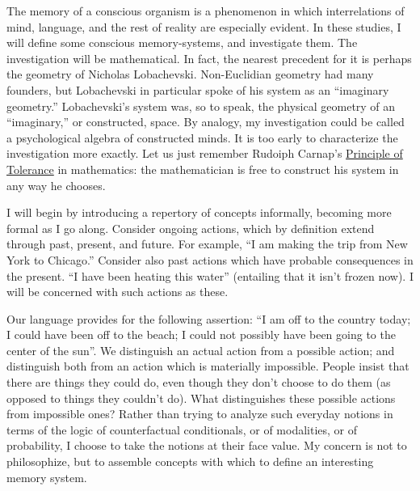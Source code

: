 

The memory of a conscious organism is a phenomenon in which 
interrelations of mind, language, and the rest of reality are especially evident. 
In these studies, I will define some conscious memory-systems, and 
investigate them. The investigation will be mathematical. In fact, the nearest 
precedent for it is perhaps the geometry of Nicholas Lobachevski. 
Non-Euclidian geometry had many founders, but Lobachevski in particular 
spoke of his system as an \enquote{imaginary geometry.} Lobachevski's system was, 
so to speak, the physical geometry of an \enquote{imaginary,} or constructed, space. 
By analogy, my investigation could be called a psychological algebra of 
constructed minds. It is too early to characterize the investigation more 
exactly. Let us just remember Rudoiph Carnap's \uline{Principle of Tolerance} in 
mathematics: the mathematician is free to construct his system in any way 
he chooses. 

I will begin by introducing a repertory of concepts informally, becoming more formal as I go along. Consider ongoing actions, which by definition extend through past, present, and future. For example, \enquote{I am making the trip from New York to Chicago.} Consider also past actions which have probable consequences in the present. \enquote{I have been heating this water} (entailing that it isn't frozen now). I will be concerned with such actions as these. 

Our language provides for the following assertion: \enquote{I am off to the country today; I could have been off to the beach; I could not possibly have been going to the center of the sun}. We distinguish an actual action from a possible action; and distinguish both from an action which is materially impossible. People insist that there are things they could do, even though they don't choose to do them (as opposed to things they couldn't do). What distinguishes these possible actions from impossible ones? Rather than trying to analyze such everyday notions in terms of the logic of counterfactual conditionals, or of modalities, or of probability, I choose to take the notions at their face value. My concern is not to philosophize, but to assemble concepts with which to define an interesting memory system. 

